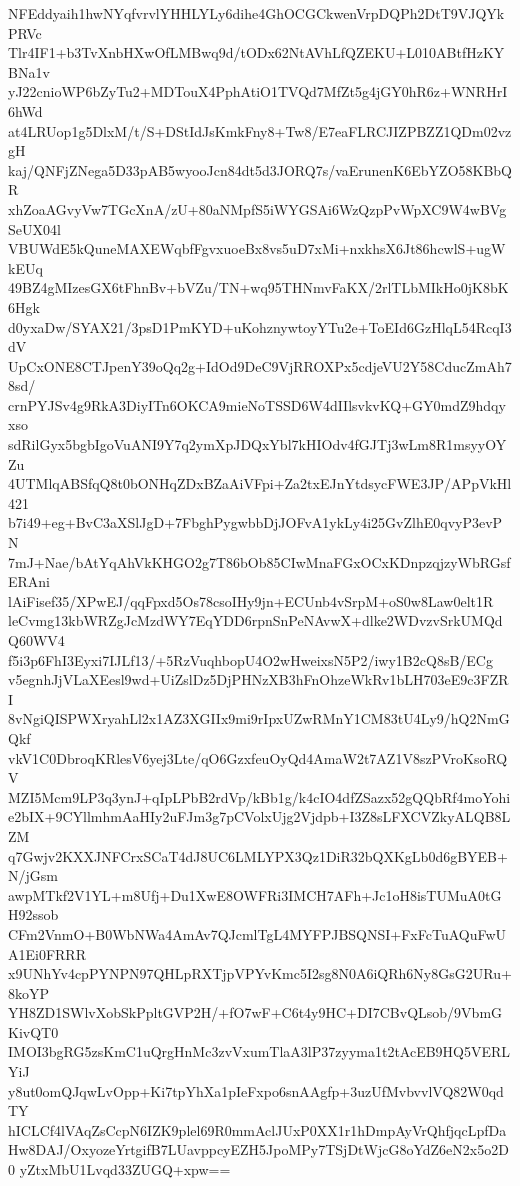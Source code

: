 NFEddyaih1hwNYqfvrvlYHHLYLy6dihe4GhOCGCkwenVrpDQPh2DtT9VJQYkPRVc
Tlr4IF1+b3TvXnbHXwOfLMBwq9d/tODx62NtAVhLfQZEKU+L010ABtfHzKYBNa1v
yJ22cnioWP6bZyTu2+MDTouX4PphAtiO1TVQd7MfZt5g4jGY0hR6z+WNRHrI6hWd
at4LRUop1g5DlxM/t/S+DStIdJsKmkFny8+Tw8/E7eaFLRCJIZPBZZ1QDm02vzgH
kaj/QNFjZNega5D33pAB5wyooJcn84dt5d3JORQ7s/vaErunenK6EbYZO58KBbQR
xhZoaAGvyVw7TGcXnA/zU+80aNMpfS5iWYGSAi6WzQzpPvWpXC9W4wBVgSeUX04l
VBUWdE5kQuneMAXEWqbfFgvxuoeBx8vs5uD7xMi+nxkhsX6Jt86hcwlS+ugWkEUq
49BZ4gMIzesGX6tFhnBv+bVZu/TN+wq95THNmvFaKX/2rlTLbMIkHo0jK8bK6Hgk
d0yxaDw/SYAX21/3psD1PmKYD+uKohznywtoyYTu2e+ToEId6GzHlqL54RcqI3dV
UpCxONE8CTJpenY39oQq2g+IdOd9DeC9VjRROXPx5cdjeVU2Y58CducZmAh78sd/
crnPYJSv4g9RkA3DiyITn6OKCA9mieNoTSSD6W4dIIlsvkvKQ+GY0mdZ9hdqyxso
sdRilGyx5bgbIgoVuANI9Y7q2ymXpJDQxYbl7kHIOdv4fGJTj3wLm8R1msyyOYZu
4UTMlqABSfqQ8t0bONHqZDxBZaAiVFpi+Za2txEJnYtdsycFWE3JP/APpVkHl421
b7i49+eg+BvC3aXSlJgD+7FbghPygwbbDjJOFvA1ykLy4i25GvZlhE0qvyP3evPN
7mJ+Nae/bAtYqAhVkKHGO2g7T86bOb85CIwMnaFGxOCxKDnpzqjzyWbRGsfERAni
lAiFisef35/XPwEJ/qqFpxd5Os78csoIHy9jn+ECUnb4vSrpM+oS0w8Law0elt1R
leCvmg13kbWRZgJcMzdWY7EqYDD6rpnSnPeNAvwX+dlke2WDvzvSrkUMQdQ60WV4
f5i3p6FhI3Eyxi7IJLf13/+5RzVuqhbopU4O2wHweixsN5P2/iwy1B2cQ8sB/ECg
v5egnhJjVLaXEesl9wd+UiZslDz5DjPHNzXB3hFnOhzeWkRv1bLH703eE9c3FZRI
8vNgiQISPWXryahLl2x1AZ3XGIIx9mi9rIpxUZwRMnY1CM83tU4Ly9/hQ2NmGQkf
vkV1C0DbroqKRlesV6yej3Lte/qO6GzxfeuOyQd4AmaW2t7AZ1V8szPVroKsoRQV
MZI5Mcm9LP3q3ynJ+qIpLPbB2rdVp/kBb1g/k4cIO4dfZSazx52gQQbRf4moYohi
e2bIX+9CYllmhmAaHIy2uFJm3g7pCVolxUjg2Vjdpb+I3Z8sLFXCVZkyALQB8LZM
q7Gwjv2KXXJNFCrxSCaT4dJ8UC6LMLYPX3Qz1DiR32bQXKgLb0d6gBYEB+N/jGsm
awpMTkf2V1YL+m8Ufj+Du1XwE8OWFRi3IMCH7AFh+Jc1oH8isTUMuA0tGH92ssob
CFm2VnmO+B0WbNWa4AmAv7QJcmlTgL4MYFPJBSQNSI+FxFcTuAQuFwUA1Ei0FRRR
x9UNhYv4cpPYNPN97QHLpRXTjpVPYvKmc5I2sg8N0A6iQRh6Ny8GsG2URu+8koYP
YH8ZD1SWlvXobSkPpltGVP2H/+fO7wF+C6t4y9HC+DI7CBvQLsob/9VbmGKivQT0
IMOI3bgRG5zsKmC1uQrgHnMc3zvVxumTlaA3lP37zyyma1t2tAcEB9HQ5VERLYiJ
y8ut0omQJqwLvOpp+Ki7tpYhXa1pIeFxpo6snAAgfp+3uzUfMvbvvlVQ82W0qdTY
hICLCf4lVAqZsCcpN6IZK9plel69R0mmAclJUxP0XX1r1hDmpAyVrQhfjqcLpfDa
Hw8DAJ/OxyozeYrtgifB7LUavppcyEZH5JpoMPy7TSjDtWjcG8oYdZ6eN2x5o2D0
yZtxMbU1Lvqd33ZUGQ+xpw==
